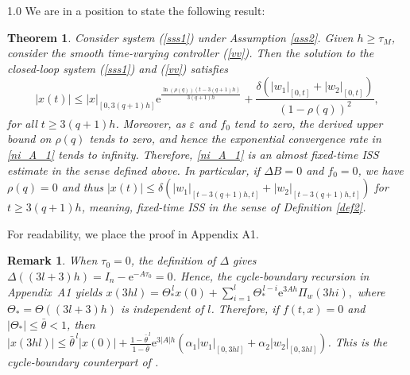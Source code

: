 \documentclass[journal]{IEEEtran}
\newtheorem{theorem}{Theorem}
\newtheorem{remark}{Remark}
\begin{document}
\begin{spacing}{1.0}
We are in a position to state the following result:

\begin{theorem}
\label{the_4}Consider system (\ref{sss1}) under Assumption \ref{ass2}. Given
$h\geq\tau_{M}$, consider the smooth time-varying controller (\ref{vv}). Then
the solution to the closed-loop system (\ref{sss1}) and (\ref{vv}) satisfies
\begin{equation}
|x(t)|\leq|x|_{[0,3(q+1)h]}\mathrm{e}^{\frac{\ln(\rho(q))(t-3(q+1)h)}{3(q+1)h}}%
+\frac{\delta(|w_{1}|_{[0,t]}+|w_{2}|_{[0,t]})}{(1-\rho(q))^{2}}, \label{ni_A_1}%
\end{equation}
for all $t\geq3(q+1)h$. Moreover, as $\varepsilon$ and $f_{0}$ tend to zero, the derived upper bound
on $\rho(q)$ tends to zero, and hence the exponential convergence rate in
\eqref{ni_A_1} tends to infinity. Therefore, \eqref{ni_A_1} is an almost
fixed-time ISS estimate in the sense defined above. In particular, if $\mathit{\Delta}B=0$ and $f_{0}=0$, we
have $\rho(q)=0$ and thus $|x(t)|\leq\delta(|w_{1}|_{[t-3(q+1)h,t]}+|w_{2}|_{[t-3(q+1)h,t]})$ for
$t\geq3(q+1)h$, meaning, fixed-time ISS in the
sense of Definition \ref{def2}.
\end{theorem}

For readability, we place the proof in Appendix A1.

\begin{remark}
When \(\tau_{0}=0\), the definition of \(\mathit{\Delta}\) gives
$\mathit{\Delta}((3l+3)h)=I_{n}-\mathrm{e}^{-A\tau_{0}}=0$.
Hence, the cycle-boundary recursion in Appendix~A1 yields
$
x(3hl)=\mathit{\Theta}_{\ast}^{\,l}x(0)
+\sum_{i=1}^{l}\mathit{\Theta}_{\ast}^{\,l-i}
\mathrm{e}^{3Ah}\mathit{\Pi}_{w}(3hi),
$
where
\(\mathit{\Theta}_{\ast}=\mathit{\Theta}((3l+3)h)\) is independent
of \(l\). Therefore, if \(f(t,x)=0\) and
\(\lvert\mathit{\Theta}_{\ast}\rvert\leq\bar{\theta}<1\), then
$|x(3hl)|
\leq{}\bar{\theta}^{\,l}|x(0)|
+\frac{1-\bar{\theta}^{\,l}}{1-\bar{\theta}}
\mathrm{e}^{3|A|h}(
\alpha_{1}|w_{1}|_{[0,3hl]}
+\alpha_{2}|w_{2}|_{[0,3hl]}
)$.
This is the cycle-boundary counterpart of \cite[(23)]{Mazenc25tac}.
\end{remark}




\end{spacing}
\end{document}
